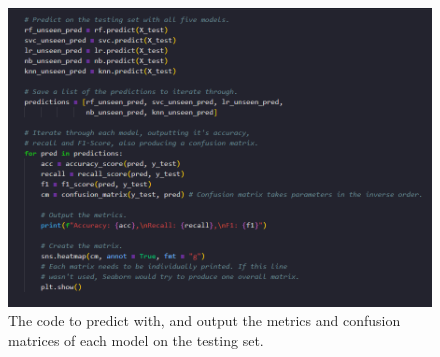 \documentclass[12pt]{report}
\begin{document}
\begin{figure}[H]
    \centering
    \includegraphics[width=\linewidth]{ModelDev/Iteration1/Code/Unseen/Matrices.png}
    \caption{The code to predict with, and output the metrics and confusion matrices of each model on the testing set.}
    \label{fig:UnseenDataCode}
\end{figure}
\end{document}
